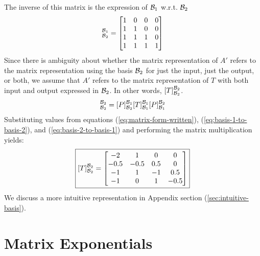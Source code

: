\documentclass{homework}
\begin{document}
\begin{letterenum}
            The inverse of this matrix is the expression of $\mathcal{B}_1$ w.r.t.
            $\mathcal{B}_2$
            \begin{equation}
                [P]_{\basis_2}^{\basis_1} = \begin{bmatrix}
                    1 & 0 & 0 & 0 \\
                    1 & 1 & 0 & 0 \\
                    1 & 1 & 1 & 0 \\
                    1 & 1 & 1 & 1 \\
                \end{bmatrix}
                \label{eq:basis-2-to-basis-1}
            \end{equation}
            Since there is ambiguity about whether the matrix representation
            of $A'$ refers to the matrix representation using the basis
            $\mathcal{B}_2$ for just the input, just the output, or both, we
            assume that $A'$ refers to the matrix representation of $T$ with
            both input and output expressed in $\mathcal{B}_2$. In other words,
            $[T]_{\mathcal{B}_2}^{\mathcal{B}_2}$.
            \begin{equation}
                [T]_{\basis_2}^{\basis_2} = [P]_{\basis_2}^{\basis_1}
                    [T]_{\basis_1}^{\basis_1}
                    [P]_{\basis_1}^{\basis_2}
            \end{equation}
            Substituting values from equations (\ref{eq:matrix-form-written}),
            (\ref{eq:basis-1-to-basis-2}), and (\ref{eq:basis-2-to-basis-1})
            and performing the matrix multiplication yields:
            \begin{equation}
                \boxed{[T]_{\mathcal{B}_2}^{\mathcal{B}_2} = \begin{bmatrix}
                    -2 &  1 &  0 &  0  \\ 
                    -0.5 & -0.5 &  0.5 &  0  \\
                    -1 &  1 & -1 &  0.5  \\
                    -1 &  0 &  1 & -0.5  \\
                \end{bmatrix}}
            \end{equation}
            We discuss a more intuitive representation in Appendix section 
            (\ref{sec:intuitive-basis}).

\end{letterenum}

\section{Matrix Exponentials}
\end{document}
